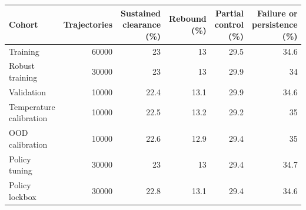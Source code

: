 \begin{tabular}{lrrrrr}
\toprule
Cohort & Trajectories & Sustained clearance (\%) & Rebound (\%) & Partial control (\%) & Failure or persistence (\%) \\
\midrule
Training & 60000 & 23 & 13 & 29.5 & 34.6 \\
Robust training & 30000 & 23 & 13 & 29.9 & 34 \\
Validation & 10000 & 22.4 & 13.1 & 29.9 & 34.6 \\
Temperature calibration & 10000 & 22.5 & 13.2 & 29.2 & 35 \\
OOD calibration & 10000 & 22.6 & 12.9 & 29.4 & 35 \\
Policy tuning & 30000 & 23 & 13 & 29.4 & 34.7 \\
Policy lockbox & 30000 & 22.8 & 13.1 & 29.4 & 34.6 \\
\bottomrule
\end{tabular}
